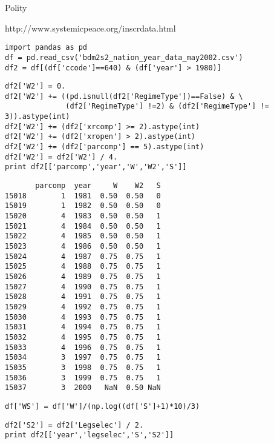 \documentclass[12pt,fleqn]{article}\usepackage{common}
\begin{document}
Polity

http://www.systemicpeace.org/inscrdata.html

\begin{verbatim}
import pandas as pd
df = pd.read_csv('bdm2s2_nation_year_data_may2002.csv')
df2 = df[(df['ccode']==640) & (df['year'] > 1980)]
\end{verbatim}

\begin{verbatim}
df2['W2'] = 0.
df2['W2'] += ((pd.isnull(df2['RegimeType'])==False) & \
              (df2['RegimeType'] !=2) & (df2['RegimeType'] != 3)).astype(int)
df2['W2'] += (df2['xrcomp'] >= 2).astype(int)
df2['W2'] += (df2['xropen'] > 2).astype(int)
df2['W2'] += (df2['parcomp'] == 5).astype(int)
df2['W2'] = df2['W2'] / 4.
print df2[['parcomp','year','W','W2','S']]
\end{verbatim}

\begin{verbatim}
       parcomp  year     W    W2   S
15018        1  1981  0.50  0.50   0
15019        1  1982  0.50  0.50   0
15020        4  1983  0.50  0.50   1
15021        4  1984  0.50  0.50   1
15022        4  1985  0.50  0.50   1
15023        4  1986  0.50  0.50   1
15024        4  1987  0.75  0.75   1
15025        4  1988  0.75  0.75   1
15026        4  1989  0.75  0.75   1
15027        4  1990  0.75  0.75   1
15028        4  1991  0.75  0.75   1
15029        4  1992  0.75  0.75   1
15030        4  1993  0.75  0.75   1
15031        4  1994  0.75  0.75   1
15032        4  1995  0.75  0.75   1
15033        4  1996  0.75  0.75   1
15034        3  1997  0.75  0.75   1
15035        3  1998  0.75  0.75   1
15036        3  1999  0.75  0.75   1
15037        3  2000   NaN  0.50 NaN
\end{verbatim}


\begin{verbatim}
df['WS'] = df['W']/(np.log((df['S']+1)*10)/3)
\end{verbatim}


\begin{verbatim}
df2['S2'] = df2['Legselec'] / 2.
print df2[['year','legselec','S','S2']]
\end{verbatim}
\end{document}
